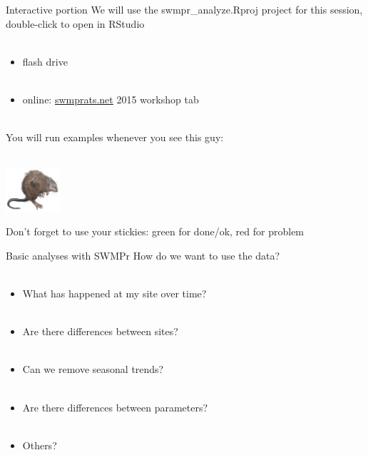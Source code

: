 \documentclass[xcolor=dvipsnames,serif]{beamer}\usepackage[]{graphicx}\usepackage[]{color}
\begin{document}
\begin{frame}{Interactive portion}
\onslide<+->
We will use the swmpr\_analyze.Rproj project for this session, double-click to open in RStudio \\~\\
\begin{itemize}
\item flash drive\\~\\
\item online: \href{http://swmprats.net/}{swmprats.net} 2015 workshop tab \\~\\
\end{itemize}
\onslide<+->
You will run examples whenever you see this guy: \\~\\
\centerline{\includegraphics[width = 0.15\textwidth]{imgs/swmprat.png}} 
Don't forget to use your stickies: {\color{green} green} for done/ok, {\color{red} red} for problem
\end{frame}

\begin{frame}[t]{Basic analyses with SWMPr}
\onslide<+->
How do we want to use the data? \\~\\
\onslide<+->
\begin{itemize}
\item What has happened at my site over time? \\~\\
\item Are there differences between sites? \\~\\
\item Can we remove seasonal trends? \\~\\
\item Are there differences between parameters? \\~\\
\item Others?
\end{itemize}
\end{frame}
\end{document}
